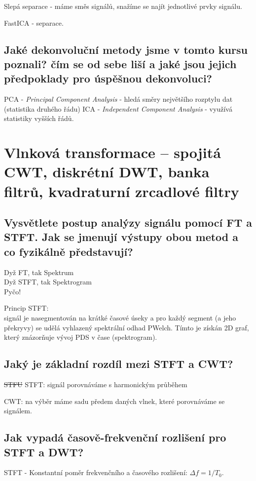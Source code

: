 \documentclass[a4paper,12pt]{article}   %
\newcommand{\mt}[1]{$#1$}
\begin{document}
Slepá separace - máme směs signálů, snažíme se najít jednotlivé prvky signálu.

FastICA - separace.


\subsection{Jaké dekonvoluční metody jsme v tomto kursu poznali? čím se od sebe liší a jaké jsou jejich předpoklady pro úspěšnou dekonvoluci?}

\begin{outline}
        \1 PCA - \textit{Principal Component Analysis} - hledá směry největšího rozptylu dat (statistika druhého řádu)
        \1 ICA - \textit{Independent Component Analysis} - využívá statistiky vyšších řádů.
\end{outline}



\newpage \section{Vlnková transformace – spojitá CWT, diskrétní DWT, banka filtrů, kvadraturní zrcadlové filtry}

\subsection{Vysvětlete postup analýzy signálu pomocí FT a STFT. Jak se jmenují výstupy obou metod a co fyzikálně představují?}
Dyž FT, tak Spektrum\\
Dyž STFT, tak Spektrogram\\
Pyčo!

Princip STFT:\\
signál je nasegmentován na krátké časové úseky a pro každý segment (a jeho překryvy) se udělá vyhlazený spektrální odhad PWelch. Tímto je získán 2D graf, který znázorňuje vývoj PDS v čase (spektrogram).


\subsection{Jaký je základní rozdíl mezi STFT a CWT?}
\sout{STFU} STFT: signál porovnáváme s harmonickým průběhem

CWT: na výběr máme sadu předem daných vlnek, které porovnáváme se signálem. 

\subsection{Jak vypadá časově-frekvenční rozlišení pro STFT a DWT?}
STFT - Konstantní poměr frekvenčního a časového rozlišení: \mt{\Delta f = 1/T_0}.
\end{document}

